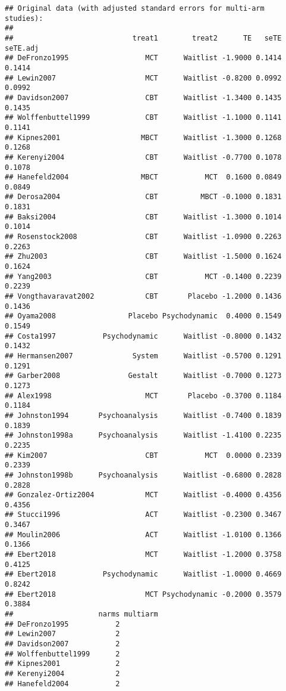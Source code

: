 \documentclass[]{book}
\theoremstyle{definition}
\theoremstyle{definition}
\theoremstyle{definition}
\theoremstyle{remark}
\begin{document}
\begin{verbatim}
## Original data (with adjusted standard errors for multi-arm studies):
## 
##                            treat1        treat2      TE   seTE seTE.adj
## DeFronzo1995                  MCT      Waitlist -1.9000 0.1414   0.1414
## Lewin2007                     MCT      Waitlist -0.8200 0.0992   0.0992
## Davidson2007                  CBT      Waitlist -1.3400 0.1435   0.1435
## Wolffenbuttel1999             CBT      Waitlist -1.1000 0.1141   0.1141
## Kipnes2001                   MBCT      Waitlist -1.3000 0.1268   0.1268
## Kerenyi2004                   CBT      Waitlist -0.7700 0.1078   0.1078
## Hanefeld2004                 MBCT           MCT  0.1600 0.0849   0.0849
## Derosa2004                    CBT          MBCT -0.1000 0.1831   0.1831
## Baksi2004                     CBT      Waitlist -1.3000 0.1014   0.1014
## Rosenstock2008                CBT      Waitlist -1.0900 0.2263   0.2263
## Zhu2003                       CBT      Waitlist -1.5000 0.1624   0.1624
## Yang2003                      CBT           MCT -0.1400 0.2239   0.2239
## Vongthavaravat2002            CBT       Placebo -1.2000 0.1436   0.1436
## Oyama2008                 Placebo Psychodynamic  0.4000 0.1549   0.1549
## Costa1997           Psychodynamic      Waitlist -0.8000 0.1432   0.1432
## Hermansen2007              System      Waitlist -0.5700 0.1291   0.1291
## Garber2008                Gestalt      Waitlist -0.7000 0.1273   0.1273
## Alex1998                      MCT       Placebo -0.3700 0.1184   0.1184
## Johnston1994       Psychoanalysis      Waitlist -0.7400 0.1839   0.1839
## Johnston1998a      Psychoanalysis      Waitlist -1.4100 0.2235   0.2235
## Kim2007                       CBT           MCT  0.0000 0.2339   0.2339
## Johnston1998b      Psychoanalysis      Waitlist -0.6800 0.2828   0.2828
## Gonzalez-Ortiz2004            MCT      Waitlist -0.4000 0.4356   0.4356
## Stucci1996                    ACT      Waitlist -0.2300 0.3467   0.3467
## Moulin2006                    ACT      Waitlist -1.0100 0.1366   0.1366
## Ebert2018                     MCT      Waitlist -1.2000 0.3758   0.4125
## Ebert2018           Psychodynamic      Waitlist -1.0000 0.4669   0.8242
## Ebert2018                     MCT Psychodynamic -0.2000 0.3579   0.3884
##                    narms multiarm
## DeFronzo1995           2         
## Lewin2007              2         
## Davidson2007           2         
## Wolffenbuttel1999      2         
## Kipnes2001             2         
## Kerenyi2004            2         
## Hanefeld2004           2         

\end{verbatim}
\end{document}
